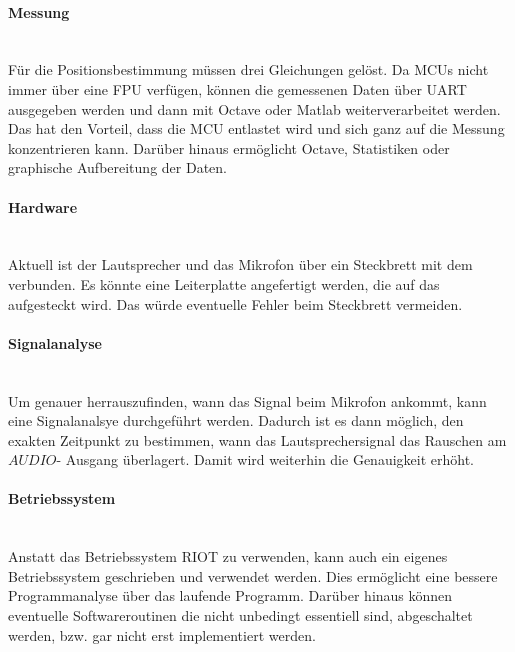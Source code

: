 \paragraph{Messung}\mbox{}\\
Für die Positionsbestimmung müssen drei Gleichungen gelöst. Da MCUs nicht immer über eine FPU verfügen, können die gemessenen Daten über UART ausgegeben werden und dann mit Octave oder Matlab weiterverarbeitet werden. Das hat den Vorteil, dass die MCU entlastet wird und sich ganz auf die Messung konzentrieren kann. Darüber hinaus ermöglicht Octave, Statistiken oder graphische Aufbereitung der Daten.

\paragraph{Hardware}\mbox{}\\
Aktuell ist der Lautsprecher und das Mikrofon über ein Steckbrett mit dem \board \platz verbunden. Es könnte eine Leiterplatte angefertigt werden, die auf das \board \platz aufgesteckt wird. Das würde eventuelle Fehler beim Steckbrett vermeiden.  

\paragraph{Signalanalyse}\mbox{}\\
Um genauer herrauszufinden, wann das Signal beim Mikrofon ankommt, kann eine Signalanalsye durchgeführt werden. Dadurch ist es dann möglich, den exakten Zeitpunkt zu bestimmen, wann das Lautsprechersignal das Rauschen am $AUDIO$- Ausgang überlagert. Damit wird weiterhin die Genauigkeit erhöht.

\paragraph{Betriebssystem}\mbox{}\\
Anstatt das Betriebssystem RIOT zu verwenden, kann auch ein eigenes Betriebssystem geschrieben und verwendet werden. Dies ermöglicht eine bessere Programmanalyse über das laufende Programm. Darüber hinaus können eventuelle Softwareroutinen die nicht unbedingt essentiell sind, abgeschaltet werden, bzw. gar nicht erst implementiert werden.






